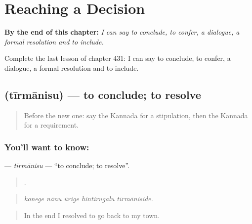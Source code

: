 
\chapter{Reaching a Decision}
\label{ch:ka-reaching-a-decision}

\begin{chapteropening}
\textbf{By the end of this chapter:} \emph{I can say to conclude, to confer, a dialogue, a formal resolution and to include.}

Complete the last lesson of chapter 431: I can say to conclude, to confer, a dialogue, a formal resolution and to include.
\end{chapteropening}

\section[\texorpdfstring{\kn{ತೀರ್ಮಾನಿಸು} (tīrmānisu)}{ತೀರ್ಮಾನಿಸು (tīrmānisu)}]{ (tīrmānisu) — to conclude; to resolve}

\label{lesson:KA-C431-tirmanisu}



\begin{quote}
Before the new one: say the Kannada for a stipulation, then the Kannada for a requirement.
\end{quote}

\subsection*{You'll want to know: }
\textbf{} — \emph{tīrmānisu} — \textquotedblleft{}to conclude; to resolve\textquotedblright{}.

\begin{quote}
    .
\end{quote}

\begin{quote}
\emph{konege nānu ūrige hintirugalu tīrmāniside.}
\end{quote}

\begin{quote}
In the end I resolved to go back to my town.
\end{quote}

